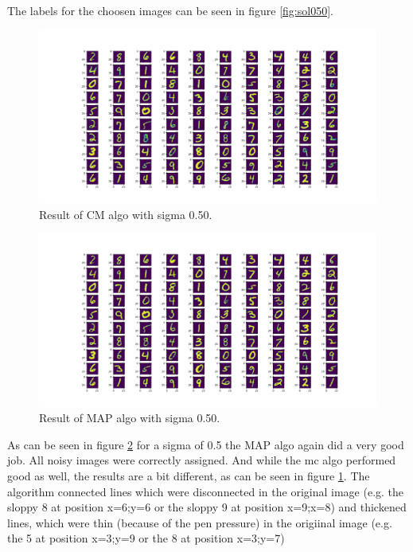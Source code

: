 \documentclass{article}
\begin{document}
The labels for the choosen images can be seen in figure \ref{fig:sol050}.
\begin{figure}[h]
  \includegraphics[width=\linewidth]{sigma_050_cm.png}
  \caption{Result of CM algo with sigma 0.50.}
  \label{fig:cm050}
\end{figure}

\begin{figure}[h]
  \includegraphics[width=\linewidth]{sigma_050_map.png}
  \caption{Result of MAP algo with sigma 0.50.}
  \label{fig:map050}
\end{figure}

As can be seen in figure \ref{fig:map050} for a sigma of 0.5 the MAP algo again did a very good job. All noisy images were correctly assigned. And while the mc algo performed good as well, the results are a bit different, as can be seen in figure \ref{fig:cm050}. The algorithm connected lines which were disconnected in the original image (e.g. the sloppy 8 at position x=6;y=6 or the sloppy 9 at position x=9;x=8) and thickened lines, which were thin (because of the pen pressure) in the origiinal image (e.g. the 5 at position x=3;y=9 or the 8 at position x=3;y=7)
\pagebreak
\end{document}

